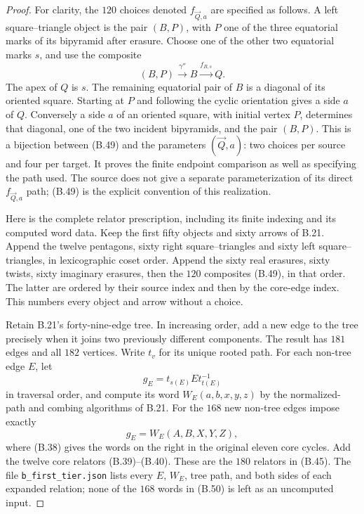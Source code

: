\begin{proof}
For clarity, the $120$ choices denoted $f_{\vec Q,a}$
are specified as follows.  A left square--triangle object
is the pair $(B,P)$, with $P$ one of the three equatorial
marks of its bipyramid after erasure.  Choose one of the
other two equatorial marks $s$, and use the composite
\[
 (B,P)\xrightarrow{\gamma''}B\xrightarrow{f_{B,s}}Q.
                                                               \tag{B.49}
\]
The apex of $Q$ is $s$.  The remaining equatorial pair
of $B$ is a diagonal of its oriented square.  Starting
at $P$ and following the cyclic orientation gives a side
$a$ of $Q$.  Conversely a side $a$ of an oriented square,
with initial vertex $P$, determines that diagonal, one
of the two incident bipyramids, and the pair $(B,P)$.
This is a bijection between (B.49) and the parameters
$(\vec Q,a)$: two choices per source and four per target.
It proves the finite endpoint comparison as well as
specifying the path used.  The source does not give a
separate parameterization of its direct $f_{\vec Q,a}$
path; (B.49) is the explicit convention of this realization.

Here is the complete relator prescription, including its
finite indexing and its computed word data.  Keep the first
fifty objects and sixty arrows of B.21.  Append the twelve
pentagons, sixty right square--triangles and sixty left
square--triangles, in lexicographic coset order.  Append
the sixty real erasures, sixty twists, sixty imaginary
erasures, then the $120$ composites (B.49), in that order.
The latter are ordered by their source index and then by
the core-edge index.  This numbers every object and arrow
without a choice.

Retain B.21's forty-nine-edge tree.  In increasing order,
add a new edge to the tree precisely when it joins two
previously different components.  The result has $181$
edges and all $182$ vertices.  Write $t_v$ for its unique
rooted path.  For each non-tree edge $E$, let
\[
 g_E=t_{s(E)}E t_{t(E)}^{-1}
\]
in traversal order, and compute its word $W_E(a,b,x,y,z)$
by the normalized-path and combing algorithms of B.21.
For the $168$ new non-tree edges impose exactly
\[
 g_E= W_E(A,B,X,Y,Z),                                \tag{B.50}
\]
where (B.38) gives the words on the right in the original
eleven core cycles.  Add the twelve core relators
(B.39)--(B.40).  These are the $180$ relators in (B.45).
The file \texttt{b\_first\_tier.json} lists every $E$,
$W_E$, tree path, and both sides of each expanded relation;
none of the $168$ words in (B.50) is left as an uncomputed
input.


\end{proof}
